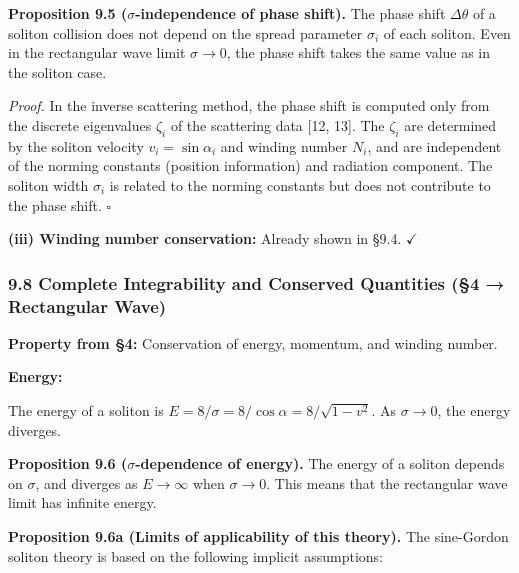 \documentclass[a4paper,11pt]{article}
\begin{document}
\textbf{Proposition 9.5 (\(\sigma\)-independence of phase shift).} The
phase shift \(\Delta\theta\) of a soliton collision does not depend on
the spread parameter \(\sigma_i\) of each soliton. Even in the
rectangular wave limit \(\sigma \to 0\), the phase shift takes the same
value as in the soliton case.

\emph{Proof.} In the inverse scattering method, the phase shift is
computed only from the discrete eigenvalues \(\zeta_i\) of the
scattering data {[}12, 13{]}. The \(\zeta_i\) are determined by the
soliton velocity \(v_i = \sin\alpha_i\) and winding number \(N_i\), and
are independent of the norming constants (position information) and
radiation component. The soliton width \(\sigma_i\) is related to the
norming constants but does not contribute to the phase shift.
\(\square\)

\textbf{(iii) Winding number conservation:} Already shown in §9.4.
\(\checkmark\)

\subsubsection{9.8 Complete Integrability and Conserved Quantities (§4 →
Rectangular
Wave)}\label{complete-integrability-and-conserved-quantities-4-rectangular-wave}

\textbf{Property from §4:} Conservation of energy, momentum, and winding
number.

\textbf{Energy:}

The energy of a soliton is
\(E = 8/\sigma = 8/\cos\alpha = 8/\sqrt{1-v^2}\). As \(\sigma \to 0\),
the energy diverges.

\textbf{Proposition 9.6 (\(\sigma\)-dependence of energy).} The energy
of a soliton depends on \(\sigma\), and diverges as \(E \to \infty\)
when \(\sigma \to 0\). This means that the rectangular wave limit has
infinite energy.

\textbf{Proposition 9.6a (Limits of applicability of this theory).} The
sine-Gordon soliton theory is based on the following implicit
assumptions:
\end{document}
